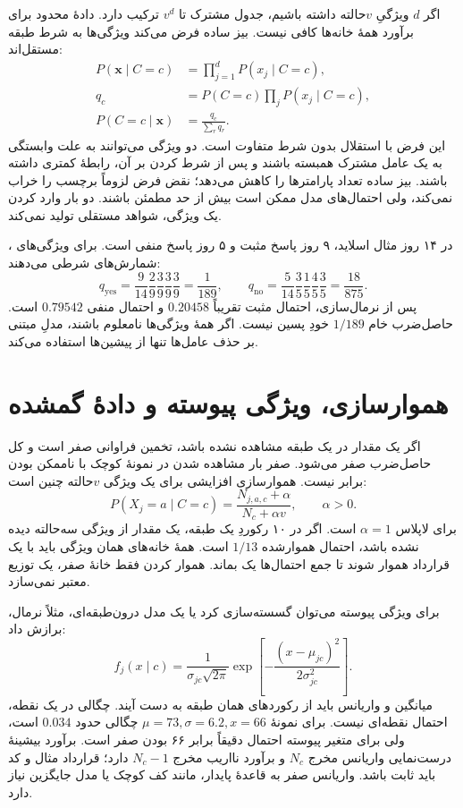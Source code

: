 \documentclass[12pt,a4paper,oneside]{report}
\newcounter{ex}[chapter]
\newenvironment{example}[1]{\refstepcounter{ex}\begin{tcolorbox}[breakable=false,title={مثال \thechapter.\arabic{ex} | #1},colframe=muted,colback=white]}{\end{tcolorbox}}
\begin{document}
اگر $d$ ویژگیِ $v$حالته داشته باشیم، جدول مشترک تا $v^d$ ترکیب دارد. دادهٔ محدود برای برآورد همهٔ خانه‌ها کافی نیست. بیز ساده فرض می‌کند ویژگی‌ها به شرط طبقه مستقل‌اند:
\begin{align*}
P(\mathbf x\mid C=c)&=\prod_{j=1}^dP(x_j\mid C=c),\\
q_c&=P(C=c)\prod_jP(x_j\mid C=c),\\
P(C=c\mid\mathbf x)&=\frac{q_c}{\sum_rq_r}.
\end{align*}
این فرض با استقلال بدون شرط متفاوت است. دو ویژگی می‌توانند به علت وابستگی به یک عامل مشترک همبسته باشند و پس از شرط کردن بر آن، رابطهٔ کمتری داشته باشند. بیز ساده تعداد پارامترها را کاهش می‌دهد؛ نقض فرض لزوماً برچسب را خراب نمی‌کند، ولی احتمال‌های مدل ممکن است بیش از حد مطمئن باشند. دو بار وارد کردن یک ویژگی، شواهد مستقلی تولید نمی‌کند.

\begin{example}{مثال گلف و محاسبهٔ پسین}
در ۱۴ روز مثال اسلاید، ۹ روز پاسخ مثبت و ۵ روز پاسخ منفی است. برای ویژگی‌های ، شمارش‌های شرطی می‌دهند:
\[q_{\mathrm{yes}}=\frac9{14}\frac29\frac39\frac39\frac39=\frac1{189},\qquad q_{\mathrm{no}}=\frac5{14}\frac35\frac15\frac45\frac35=\frac{18}{875}.\]
پس از نرمال‌سازی، احتمال مثبت تقریباً $0.20458$ و احتمال منفی $0.79542$ است. حاصل‌ضرب خام $1/189$ خودِ پسین نیست. اگر همهٔ ویژگی‌ها نامعلوم باشند، مدلِ مبتنی بر حذف عامل‌ها تنها از پیشین‌ها استفاده می‌کند.
\end{example}

\section{هموارسازی، ویژگی پیوسته و دادهٔ گمشده}
اگر یک مقدار در یک طبقه مشاهده نشده باشد، تخمین فراوانی صفر است و کل حاصل‌ضرب صفر می‌شود. صفر بار مشاهده شدن در نمونهٔ کوچک با ناممکن بودن برابر نیست. هموارسازی افزایشی برای یک ویژگی $v$حالته چنین است:
\[P(X_j=a\mid C=c)=\frac{N_{j,a,c}+\alpha}{N_c+\alpha v},\qquad\alpha>0.\]
برای لاپلاس $\alpha=1$ است. اگر در ۱۰ رکوردِ یک طبقه، یک مقدار از ویژگی سه‌حالته دیده نشده باشد، احتمال هموارشده $1/13$ است. همهٔ خانه‌های همان ویژگی باید با یک قرارداد هموار شوند تا جمع احتمال‌ها یک بماند. هموار کردن فقط خانهٔ صفر، یک توزیع معتبر نمی‌سازد.

برای ویژگی پیوسته می‌توان گسسته‌سازی کرد یا یک مدل درون‌طبقه‌ای، مثلاً نرمال، برازش داد:
\[f_j(x\mid c)=\frac1{\sigma_{jc}\sqrt{2\pi}}\exp\left[-\frac{(x-\mu_{jc})^2}{2\sigma_{jc}^2}\right].\]
میانگین و واریانس باید از رکوردهای همان طبقه به دست آیند. چگالی در یک نقطه، احتمال نقطه‌ای نیست. برای نمونهٔ $\mu=73,\sigma=6.2,x=66$ چگالی حدود $0.034$ است، ولی برای متغیر پیوسته احتمال دقیقاً برابر ۶۶ بودن صفر است. برآورد بیشینهٔ درست‌نمایی واریانس مخرج $N_c$ و برآورد نااریب مخرج $N_c-1$ دارد؛ قرارداد مثال و کد باید ثابت باشد. واریانس صفر به قاعدهٔ پایدار، مانند کف کوچک یا مدل جایگزین نیاز دارد.
\end{document}
